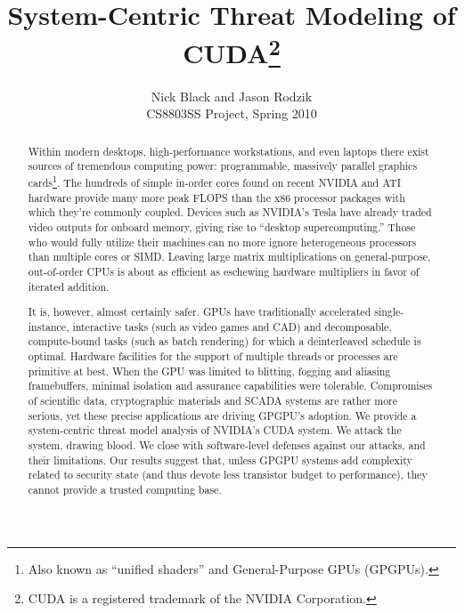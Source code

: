 \documentclass[letterpaper,10pt]{article}
\title{System-Centric Threat Modeling of CUDA\footnote{CUDA\textsuperscript{\textregistered}
is a registered trademark of the NVIDIA Corporation.}}
\author{Nick Black and Jason Rodzik\\
CS8803SS Project, Spring 2010}
\date{}
\begin{document}
\maketitle

\begin{abstract}
Within modern desktops, high-performance workstations, and even laptops there
exist sources of tremendous computing power: programmable, massively parallel graphics cards\footnote{Also known as ``unified shaders'' and General-Purpose GPUs (GPGPUs).}.
The hundreds of simple in-order cores found on recent NVIDIA and ATI hardware provide many more peak FLOPS than the x86 processor packages with
which they're commonly coupled.
Devices such as NVIDIA's Tesla\texttrademark{} have already traded video outputs for onboard memory, giving rise to ``desktop
supercomputing.'' Those who would fully utilize their machines can
no more ignore heterogeneous processors than multiple cores or SIMD. Leaving
large matrix multiplications on general-purpose, out-of-order CPUs is about as
efficient as eschewing hardware multipliers in favor of iterated addition.

It is, however, almost certainly safer. GPUs have traditionally accelerated
single-instance, interactive tasks (such as video games and CAD) and
decomposable, compute-bound tasks (such as batch rendering) for which a
deinterleaved schedule is optimal. Hardware facilities for the support of
multiple threads or processes are primitive at best. When the GPU was limited to
blitting, fogging and aliasing framebuffers, minimal isolation and
assurance capabilities were tolerable. Compromises of scientific data,
cryptographic materials and SCADA systems are rather more serious, yet these
precise applications are driving GPGPU's adoption. We provide a system-centric threat
model analysis of NVIDIA's CUDA system. We attack the system, drawing blood.
We close with software-level defenses against our attacks, and their limitations.
Our results suggest that, unless GPGPU systems add complexity related to security state (and thus devote
less transistor budget to performance), they cannot provide a trusted computing
base.

\end{abstract}
\end{document}

